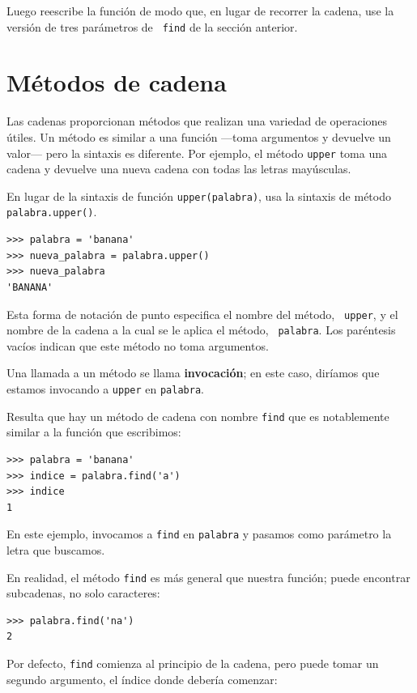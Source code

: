 \documentclass[10pt]{book}
\begin{document}
Luego reescribe la función de modo que, en lugar de
recorrer la cadena, use la versión de tres parámetros de {\tt
find} de la sección anterior.


\section{Métodos de cadena}
\label{optional}

Las cadenas proporcionan métodos que realizan una variedad de operaciones útiles.
Un método es similar a una función ---toma argumentos y
devuelve un valor--- pero la sintaxis es diferente.  Por ejemplo, el
método {\tt upper} toma una cadena y devuelve una nueva cadena con
todas las letras mayúsculas.

En lugar de la sintaxis de función {\tt upper(palabra)}, usa
la sintaxis de método {\tt palabra.upper()}.

\begin{verbatim}
>>> palabra = 'banana'
>>> nueva_palabra = palabra.upper()
>>> nueva_palabra
'BANANA'
\end{verbatim}
%
Esta forma de notación de punto especifica el nombre del método, {\tt
upper}, y el nombre de la cadena a la cual se le aplica el método, {\tt
palabra}.  Los paréntesis vacíos indican que este método no toma
argumentos.

Una llamada a un método se llama {\bf invocación}; en este caso,
diríamos que estamos invocando a {\tt upper} en {\tt palabra}.

Resulta que hay un método de cadena con nombre {\tt find} que
es notablemente similar a la función que escribimos:

\begin{verbatim}
>>> palabra = 'banana'
>>> indice = palabra.find('a')
>>> indice
1
\end{verbatim}
%
En este ejemplo, invocamos a {\tt find} en {\tt palabra} y pasamos
como parámetro la letra que buscamos.

En realidad, el método {\tt find} es más general que nuestra función;
puede encontrar subcadenas, no solo caracteres:

\begin{verbatim}
>>> palabra.find('na')
2
\end{verbatim}
%
Por defecto, {\tt find} comienza al principio de la cadena, pero
puede tomar un segundo argumento, el índice donde debería comenzar:
\end{document}
